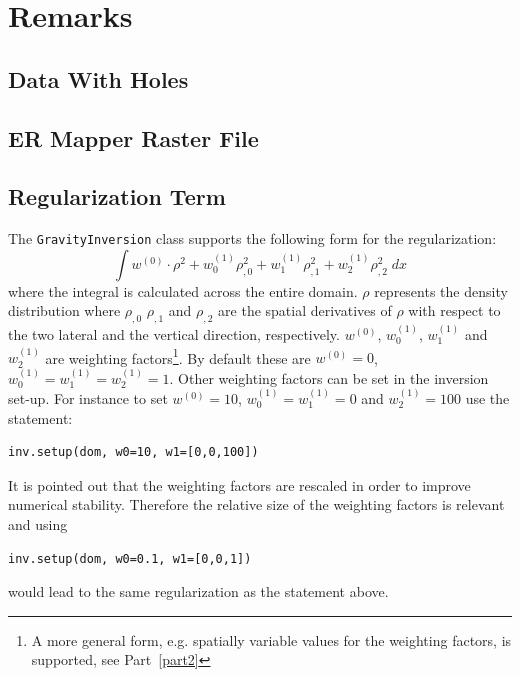 \section{Remarks}

\subsection{Data With Holes}\label{SEC:P1:GRAV:REMARK:DATAHOLES}


\subsection{ER Mapper Raster File}\label{SEC:P1:GRAV:REMARK:ERMAPPER}

\subsection{Regularization Term}\label{SEC:P1:GRAV:REMARK:REG}
The \verb|GravityInversion| class supports the following form for the
regularization:
\begin{equation}
\int w^{(0)} \cdot \rho^2 + w^{(1)}_0  \rho_{,0}^2 +  w^{(1)}_1  \rho_{,1}^2 +  w^{(1)}_2  \rho_{,2}^2\; dx   
\end{equation}
where the integral is calculated across the entire domain.
$\rho$ represents the density distribution where $\rho_{,0}$ $\rho_{,1}$ and
$\rho_{,2}$ are the spatial derivatives of $\rho$ with respect to the two
lateral and the vertical direction, respectively.
$w^{(0)}$, $w^{(1)}_0$, $w^{(1)}_1$ and $w^{(1)}_2$ are weighting
factors\footnote{A more general form, e.g. spatially variable values for the
weighting factors, is supported, see Part~\ref{part2}}.
By default these are $w^{(0)}=0$, $w^{(1)}_0=w^{(1)}_1=w^{(1)}_2=1$.
Other weighting factors can be set in the inversion set-up.
For instance to set $w^{(0)}=10$, $w^{(1)}_0=w^{(1)}_1=0$ and $w^{(1)}_2=100$
use the statement:
\begin{verbatim}
inv.setup(dom, w0=10, w1=[0,0,100])
\end{verbatim}
It is pointed out that the weighting factors are rescaled in order to improve
numerical stability. Therefore the relative size of the weighting factors is
relevant and using
\begin{verbatim}
inv.setup(dom, w0=0.1, w1=[0,0,1])
\end{verbatim}
would lead to the same regularization as the statement above.

